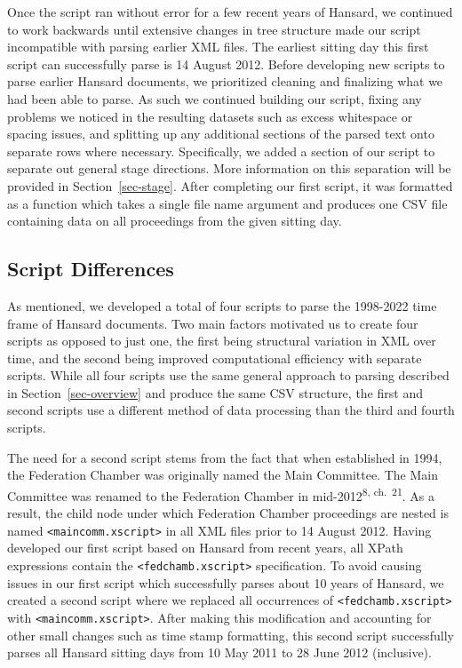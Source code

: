 \documentclass[
  letterpaper,
  DIV=11,
  numbers=noendperiod]{scrartcl}
\begin{document}
Once the script ran without error for a few recent years of Hansard, we
continued to work backwards until extensive changes in tree structure
made our script incompatible with parsing earlier XML files. The
earliest sitting day this first script can successfully parse is 14
August 2012. Before developing new scripts to parse earlier Hansard
documents, we prioritized cleaning and finalizing what we had been able
to parse. As such we continued building our script, fixing any problems
we noticed in the resulting datasets such as excess whitespace or
spacing issues, and splitting up any additional sections of the parsed
text onto separate rows where necessary. Specifically, we added a
section of our script to separate out general stage directions. More
information on this separation will be provided in
Section~\ref{sec-stage}. After completing our first script, it was
formatted as a function which takes a single file name argument and
produces one CSV file containing data on all proceedings from the given
sitting day.

\hypertarget{sec-diff}{%
\subsection{Script Differences}\label{sec-diff}}

As mentioned, we developed a total of four scripts to parse the
1998-2022 time frame of Hansard documents. Two main factors motivated us
to create four scripts as opposed to just one, the first being
structural variation in XML over time, and the second being improved
computational efficiency with separate scripts. While all four scripts
use the same general approach to parsing described in
Section~\ref{sec-overview} and produce the same CSV structure, the first
and second scripts use a different method of data processing than the
third and fourth scripts.

The need for a second script stems from the fact that when established
in 1994, the Federation Chamber was originally named the Main Committee.
The Main Committee was renamed to the Federation Chamber in
mid-2012\textsuperscript{8, ch.~21}. As a result, the child node under
which Federation Chamber proceedings are nested is named
\texttt{\textless{}maincomm.xscript\textgreater{}} in all XML files
prior to 14 August 2012. Having developed our first script based on
Hansard from recent years, all XPath expressions contain the
\texttt{\textless{}fedchamb.xscript\textgreater{}} specification. To
avoid causing issues in our first script which successfully parses about
10 years of Hansard, we created a second script where we replaced all
occurrences of \texttt{\textless{}fedchamb.xscript\textgreater{}} with
\texttt{\textless{}maincomm.xscript\textgreater{}}. After making this
modification and accounting for other small changes such as time stamp
formatting, this second script successfully parses all Hansard sitting
days from 10 May 2011 to 28 June 2012 (inclusive).
\end{document}
